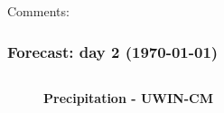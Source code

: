 \documentclass[aspectratio=169, 10pt]{beamer}
\begin{document}
\begin{frame}
\begin{columns}
\begin{column}{0.5\textwidth}
\end{column}
\end{columns}
\vspace{.2cm}
Comments:


\end{frame}




\begin{frame}
\frametitle{Forecast: day 2 ({\AdvanceDate[+2]\today})}


\begin{columns}
\begin{column}{0.5\textwidth}


\vspace{-1.4cm}
\begin{figure}
\textbf{Precipitation - UWIN-CM} \vspace{0.06cm}\\
\end{figure}

\end{column}
\begin{column}{0.5\textwidth}


\end{column}
\end{columns}
\end{frame}
\end{document}
